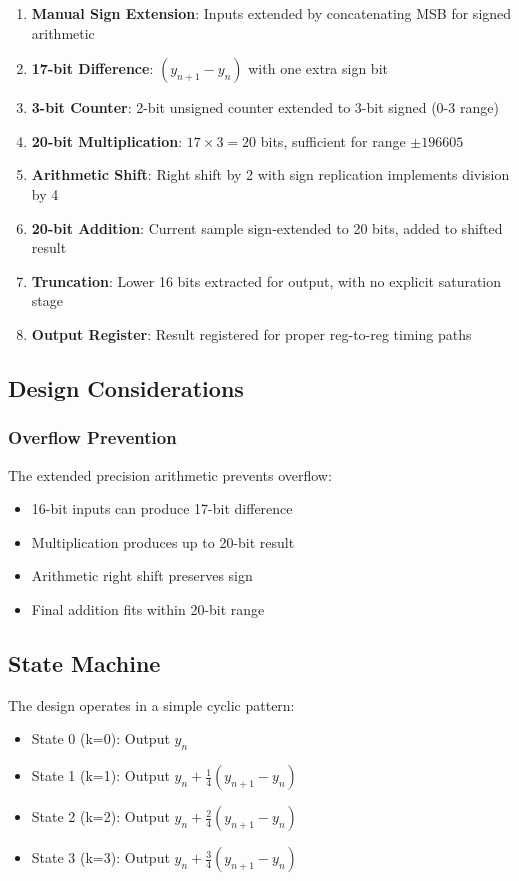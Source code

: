 \documentclass[a4paper,11pt]{article}
\begin{document}
\begin{enumerate}
    \item \textbf{Manual Sign Extension}: Inputs extended by concatenating MSB for signed arithmetic
    \item \textbf{17-bit Difference}: $(y_{n+1} - y_n)$ with one extra sign bit
    \item \textbf{3-bit Counter}: 2-bit unsigned counter extended to 3-bit signed (0-3 range)
    \item \textbf{20-bit Multiplication}: $17 \times 3 = 20$ bits, sufficient for range $\pm196605$
    \item \textbf{Arithmetic Shift}: Right shift by 2 with sign replication implements division by 4
    \item \textbf{20-bit Addition}: Current sample sign-extended to 20 bits, added to shifted result
    \item \textbf{Truncation}: Lower 16 bits extracted for output, with no explicit saturation stage
    \item \textbf{Output Register}: Result registered for proper reg-to-reg timing paths
\end{enumerate}

\subsection{Design Considerations}

\subsubsection{Overflow Prevention}

The extended precision arithmetic prevents overflow:
\begin{itemize}
    \item 16-bit inputs can produce 17-bit difference
    \item Multiplication produces up to 20-bit result
    \item Arithmetic right shift preserves sign
    \item Final addition fits within 20-bit range
\end{itemize}



\subsection{State Machine}

The design operates in a simple cyclic pattern:
\begin{itemize}
    \item State 0 (k=0): Output $y_n$
    \item State 1 (k=1): Output $y_n + \frac{1}{4}(y_{n+1} - y_n)$
    \item State 2 (k=2): Output $y_n + \frac{2}{4}(y_{n+1} - y_n)$
    \item State 3 (k=3): Output $y_n + \frac{3}{4}(y_{n+1} - y_n)$
\end{itemize}
\end{document}
